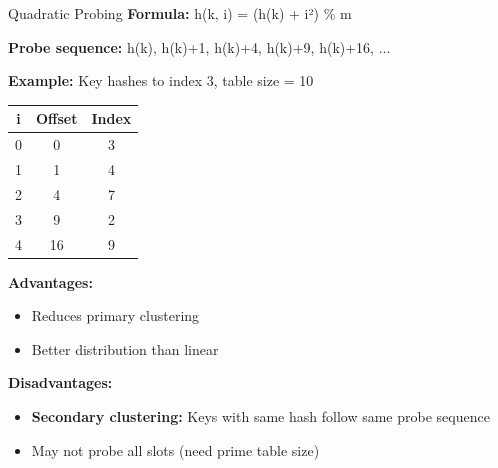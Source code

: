 \documentclass[aspectratio=169]{beamer}
\begin{document}
\begin{frame}{Quadratic Probing}
  \textbf{Formula:} h(k, i) = (h(k) + i²) \% m

  \textbf{Probe sequence:} h(k), h(k)+1, h(k)+4, h(k)+9, h(k)+16, ...

  \vspace{0.3cm}
  \textbf{Example:} Key hashes to index 3, table size = 10
  \begin{center}
    \begin{tabular}{c|c|c}
      i & Offset & Index \\
      \hline
      0 & 0 & 3 \\
      1 & 1 & 4 \\
      2 & 4 & 7 \\
      3 & 9 & 2 \\
      4 & 16 & 9 \\
    \end{tabular}
  \end{center}

  \vspace{0.3cm}
  \textbf{Advantages:}
  \begin{itemize}
    \item Reduces primary clustering
    \item Better distribution than linear
  \end{itemize}

  \textbf{Disadvantages:}
  \begin{itemize}
    \item \textbf{Secondary clustering:} Keys with same hash follow same probe sequence
    \item May not probe all slots (need prime table size)
  \end{itemize}
\end{frame}
\end{document}
